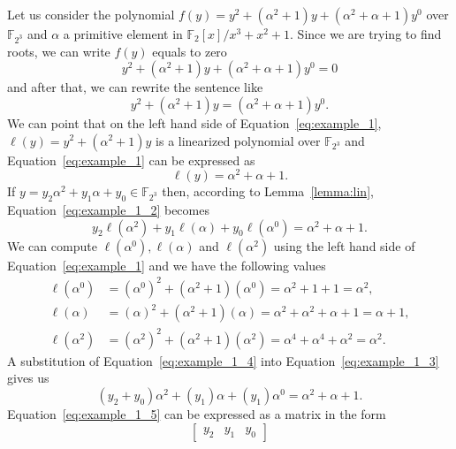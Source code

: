 \begin{example}\label{ex:1}
Let us consider the polynomial $f(y) = y^2 + (\alpha^2+1)y + (\alpha^2 +\alpha +1)y^0$ over $\mathbb{F}_{2^3}$ and $\alpha$ a primitive element in $\mathbb{F}_2[x]/ x^3+x^2+1$. Since we are trying to find roots, we can write $f(y)$ equals to zero
 $$ y^2 + (\alpha^2+1)y + (\alpha^2 +\alpha +1)y^0 = 0$$
 and after that, we can rewrite the sentence like
\begin{equation}\label{eq:example_1}
    y^2 + (\alpha^2+1)y   = (\alpha^2 +\alpha +1)y^0.
\end{equation}
We can point that on the left hand side of Equation~\ref{eq:example_1}, $\ell(y) = y^2 + (\alpha^2+1)y$ is a linearized polynomial over $\mathbb{F}_{2^3}$ and Equation~\ref{eq:example_1} can be expressed as
\begin{equation}\label{eq:example_1_2}
    \ell(y) = \alpha^2 +\alpha +1.
\end{equation}
If $y = y_2\alpha^2 + y_1\alpha + y_0 \in \mathbb{F}_{2^3}$ then, according to Lemma~\ref{lemma:lin}, Equation~\ref{eq:example_1_2} becomes
\begin{equation}\label{eq:example_1_3}
    y_2\ell(\alpha^2) + y_1\ell(\alpha) + y_0\ell(\alpha^0) = \alpha^2 +\alpha +1.
\end{equation}
We can compute $\ell(\alpha^0),\ell(\alpha)$ and $\ell(\alpha^2)$ using the left hand side of Equation~\ref{eq:example_1} and we have the following values
\begin{equation}\label{eq:example_1_4}
    \begin{split}
        \ell(\alpha^0) &= (\alpha^0)^2 + (\alpha^2+1)(\alpha^0) = \alpha^2+1 + 1 = \alpha^2, \\
        \ell(\alpha) &= (\alpha)^2 + (\alpha^2+1)(\alpha) = \alpha^2 + \alpha^2+ \alpha + 1 = \alpha + 1, \\
        \ell(\alpha^2) &= (\alpha^2)^2 + (\alpha^2+1)(\alpha^2) = \alpha^4 +\alpha^4 +  \alpha^2 = \alpha^2.
    \end{split}
\end{equation}
A substitution of Equation~\ref{eq:example_1_4} into Equation~\ref{eq:example_1_3} gives us
\begin{equation}\label{eq:example_1_5}
     (y_2+y_0)\alpha^2 + (y_1)\alpha + (y_1)\alpha^0 = \alpha^2 +\alpha +1.
\end{equation}
Equation~\ref{eq:example_1_5} can be expressed as a matrix in the form
\begin{equation}\label{eq:example_1_6}
    \begin{bmatrix} y_2 & y_1 & y_0 \end{bmatrix}

\end{equation}
\end{example}
